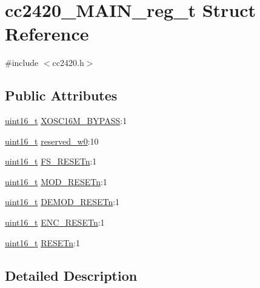 \hypertarget{structcc2420___m_a_i_n__reg__t}{}\section{cc2420\+\_\+\+M\+A\+I\+N\+\_\+reg\+\_\+t Struct Reference}
\label{structcc2420___m_a_i_n__reg__t}


{\ttfamily \#include $<$cc2420.\+h$>$}

\subsection*{Public Attributes}
\begin{DoxyCompactItemize}
\item 
\hyperlink{_p_e___types_8h_a1f1825b69244eb3ad2c7165ddc99c956}{uint16\+\_\+t} \hyperlink{structcc2420___m_a_i_n__reg__t_ace5da77e8fc9d86705cd6db2680ff631}{X\+O\+S\+C16\+M\+\_\+\+B\+Y\+P\+A\+SS}\+:1
\item 
\hyperlink{_p_e___types_8h_a1f1825b69244eb3ad2c7165ddc99c956}{uint16\+\_\+t} \hyperlink{structcc2420___m_a_i_n__reg__t_ac0d303fde870b6c2dfc28ac55e88d0be}{reserved\+\_\+w0}\+:10
\item 
\hyperlink{_p_e___types_8h_a1f1825b69244eb3ad2c7165ddc99c956}{uint16\+\_\+t} \hyperlink{structcc2420___m_a_i_n__reg__t_a27ad20fa3b567e34eca0e0ec76ee7858}{F\+S\+\_\+\+R\+E\+S\+E\+Tn}\+:1
\item 
\hyperlink{_p_e___types_8h_a1f1825b69244eb3ad2c7165ddc99c956}{uint16\+\_\+t} \hyperlink{structcc2420___m_a_i_n__reg__t_a4131daa970a92ca146379a4ca9ce9b07}{M\+O\+D\+\_\+\+R\+E\+S\+E\+Tn}\+:1
\item 
\hyperlink{_p_e___types_8h_a1f1825b69244eb3ad2c7165ddc99c956}{uint16\+\_\+t} \hyperlink{structcc2420___m_a_i_n__reg__t_a5c88a2f89bc935e22631edb18ff234f9}{D\+E\+M\+O\+D\+\_\+\+R\+E\+S\+E\+Tn}\+:1
\item 
\hyperlink{_p_e___types_8h_a1f1825b69244eb3ad2c7165ddc99c956}{uint16\+\_\+t} \hyperlink{structcc2420___m_a_i_n__reg__t_a69433eaf4bdf41d7c644b9a4f19ecaff}{E\+N\+C\+\_\+\+R\+E\+S\+E\+Tn}\+:1
\item 
\hyperlink{_p_e___types_8h_a1f1825b69244eb3ad2c7165ddc99c956}{uint16\+\_\+t} \hyperlink{structcc2420___m_a_i_n__reg__t_a3f5e1b943b2ae4dcbcf612a1520e09d3}{R\+E\+S\+E\+Tn}\+:1
\end{DoxyCompactItemize}


\subsection{Detailed Description}


